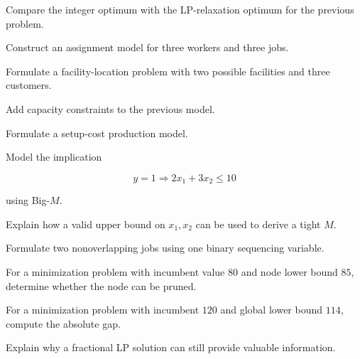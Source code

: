 \begin{exercise}[3]
Compare the integer optimum with the LP-relaxation optimum for the
previous problem.
\end{exercise}

\begin{exercise}[3]
Construct an assignment model for three workers and three jobs.
\end{exercise}

\begin{exercise}[3]
Formulate a facility-location problem with two possible facilities and
three customers.
\end{exercise}

\begin{exercise}[3]
Add capacity constraints to the previous model.
\end{exercise}

\begin{exercise}[3]
Formulate a setup-cost production model.
\end{exercise}

\begin{exercise}[3]
Model the implication

\[
y=1
\Rightarrow
2x_1+3x_2\leq10
\]

using Big-\(M\).
\end{exercise}

\begin{exercise}[3]
Explain how a valid upper bound on \(x_1,x_2\) can be used to derive a
tight \(M\).
\end{exercise}

\begin{exercise}[3]
Formulate two nonoverlapping jobs using one binary sequencing variable.
\end{exercise}

\begin{exercise}[3]
For a minimization problem with incumbent value \(80\) and node lower
bound \(85\), determine whether the node can be pruned.
\end{exercise}

\begin{exercise}[3]
For a minimization problem with incumbent \(120\) and global lower bound
\(114\), compute the absolute gap.
\end{exercise}

\begin{exercise}[3]
Explain why a fractional LP solution can still provide valuable
information.
\end{exercise}


